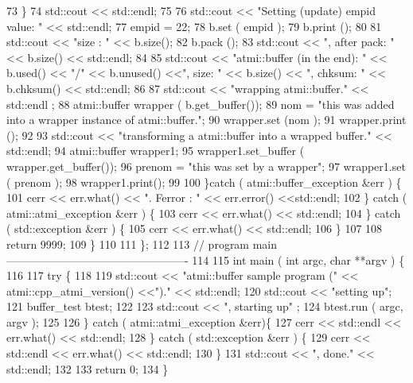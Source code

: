\begin{DoxyCodeInclude}
73         \}
74         std::cout << std::endl;
75 
76         std::cout << "Setting (update) empid value: " << std::endl;
77         empid = 22;
78         b.set ( empid );
79         b.print ();
80 
81         std::cout << "size : " << b.size();
82         b.pack ();
83         std::cout << ", after pack: " << b.size() << std::endl;
84 
85         std::cout << "atmi::buffer (in the end): " << b.used() << "/" << b.unused() <<", size: " <<
       b.size() << ", chksum: " << b.chksum() <<  std::endl;
86 
87         std::cout << "wrapping atmi::buffer." << std::endl ;
88         atmi::buffer wrapper ( b.get\_buffer());
89         nom = "this was added into a wrapper instance of atmi::buffer.";
90         wrapper.set (nom );
91         wrapper.print ();
92 
93         std::cout << "transforming a atmi::buffer into a wrapped buffer." << std::endl;
94         atmi::buffer wrapper1;
95         wrapper1.set\_buffer ( wrapper.get\_buffer());
96         prenom = "this was set by a wrapper";
97         wrapper1.set ( prenom );
98         wrapper1.print();
99 
100       \}catch ( atmi::buffer\_exception &err ) \{
101         cerr << err.what() << ". Ferror : " << err.error() <<std::endl;
102       \} catch ( atmi::atmi\_exception &err ) \{
103         cerr << err.what() << std::endl;
104       \} catch ( std::exception &err ) \{
105         cerr << err.what() << std::endl;
106       \}
107 
108       return 9999;
109     \}
110 
111 \};
112 
113 // program main -------------------------------------------------
114 
115 int main ( int argc, char **argv ) \{
116 
117   try \{
118 
119     std::cout << "atmi::buffer sample program (" << atmi::cpp\_atmi\_version() <<")." << std::endl;
120     std::cout << "setting up";
121     buffer\_test btest;
122 
123     std::cout << ", starting up" ;
124     btest.run ( argc, argv );
125 
126   \} catch ( atmi::atmi\_exception &err)\{
127     cerr << std::endl << err.what() << std::endl;
128   \} catch ( std::exception &err ) \{
129     cerr << std::endl << err.what() << std::endl;
130   \}
131   std::cout << ", done." << std::endl;
132 
133   return 0;
134 \}
\end{DoxyCodeInclude}
 